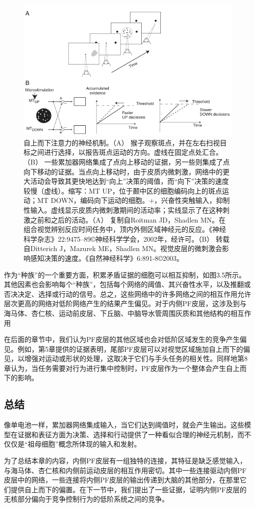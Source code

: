 \begin{figure}[!htb]
	\centering
	\includegraphics{image_pfc/Fig_3_5}
	\caption*{自上而下注意力的神经机制。（A） 猴子观察斑点，并在左右扫视目标之间进行选择，以报告斑点运动的方向。虚线在固定点处汇合。（B） 一些累加器网络集成了点向上移动的证据，另一些则集成了点向下移动的证据。当点向上移动时，由于皮质内微刺激，网络中的更大活动会导致其更快地达到“向上”决策的阈值，而“向下”决策的速度较慢（虚线）。缩写：MT UP，位于颞中区的细胞编码向上的斑点运动；MT DOWN，编码向下运动的细胞。+，兴奋性突触输入，抑制性输入。虚线显示皮质内微刺激期间的活动率；实线显示了在这种刺激之前和之后的活动。（A） 复制自Roitman JD，Shadlen MN。在组合视觉辨别反应时间任务中，顶内外侧区域神经元的反应。《神经科学杂志》22:9475–89©神经科学学会，2002年，经许可。（B） 转载自Ditterich J，Mazurek ME，Shadlen MN。视觉皮层的微刺激会影响感知决策的速度。《自然神经科学》6:891-8©2003。}
	\label{fig:fig}
\end{figure}
作为“种族”的一个重要方面，积累矛盾证据的细胞可以相互抑制，如图3.5所示。其他因素也会影响每个“种族”，包括每个网络的阈值、其兴奋性水平，以及推翻或否决决定、选择或行动的信号。总之，这些网络中的许多网络之间的相互作用允许层次更高的网络对低阶网络产生的结果产生偏见。对于内侧PF皮层，这涉及到与海马体、杏仁核、运动前皮层、下丘脑、中脑导水管周围灰质和其他结构的相互作用\par
在后面的章节中，我们认为PF皮层的其他区域也会对低阶区域发生的竞争产生偏见。例如，第5章提供的证据表明，尾部PF皮层可以对视觉区域施加自上而下的偏见，以增强对运动或形状的处理，这取决于它们与手头任务的相关性。同样地第8章认为，当任务需要对行为进行集中控制时，PF皮层作为一个整体会产生自上而下的影响。\par
\subsection{总结}
像单电池一样，累加器网络集成输入，当它们达到阈值时，就会产生输出。这些模型在证据和表征方面为决策、选择和行动提供了一种看似合理的神经元机制，而不仅仅是“祖母细胞”概念所体现的输入和发射。\par
为了总结本章的内容，内侧PF皮层有一组独特的连接，其特征是缺乏感觉输入，与海马体、杏仁核和内侧前运动皮层的相互作用密切。其中一些连接驱动内侧PF皮层中的网络，一些连接将内侧PF皮层的输出传递到大脑的其他部分，在那里它们提供自上而下的偏置。在下一节中，我们提出了一些证据，证明内侧PF皮层的无核部分偏向于竞争控制行为的低阶系统之间的竞争。\par
